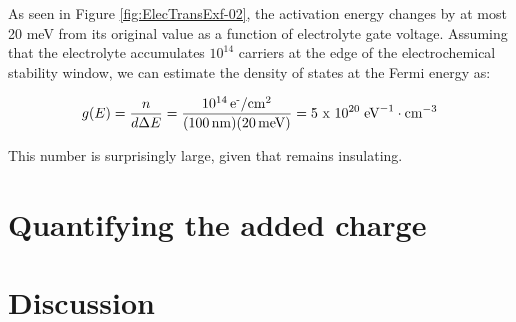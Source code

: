 As seen in Figure \ref{fig:ElecTransExf-02}, the activation energy changes by at most 20 meV from its original value as a function of electrolyte gate voltage. Assuming that the electrolyte accumulates $10^{14}$ \percmsq{} carriers at the edge of the electrochemical stability window, we can estimate the density of states at the Fermi energy as:

\begin{equation}
g(E) = \frac{n}{d \Delta E} = \frac{10^{14}\, \text{e\textsuperscript{-}/cm\textsuperscript{2}}}{(100\, \text{nm})(20\, \text{meV})} = \text{5 x 10}^{20}\; \text{eV}^{-1} \cdot \text{cm}^{-3}
\end{equation}

This number is surprisingly large, given that \rucl remains insulating.



\section{Quantifying the added charge}

\section{Discussion}